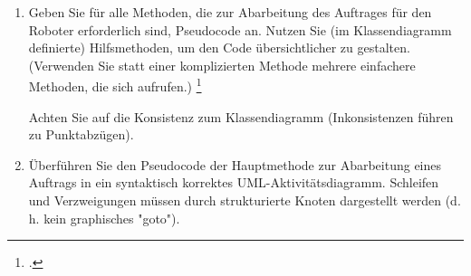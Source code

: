 \documentclass{bschlangaul-aufgabe}
\begin{document}

\begin{enumerate}


\item Geben Sie für alle Methoden, die zur Abarbeitung des Auftrages für
den Roboter erforderlich sind, Pseudocode an. Nutzen Sie (im
Klassendiagramm definierte) Hilfsmethoden, um den Code übersichtlicher
zu gestalten. (Verwenden Sie statt einer komplizierten Methode mehrere
einfachere Methoden, die sich aufrufen.)
\footcite{examen:66116:2019:03}

Achten Sie auf die Konsistenz zum Klassendiagramm (Inkonsistenzen führen
zu Punktabzügen).


\item Überführen Sie den Pseudocode der Hauptmethode zur Abarbeitung
eines Auftrags in ein syntaktisch korrektes UML-Aktivitätsdiagramm.
Schleifen und Verzweigungen müssen durch strukturierte Knoten
dargestellt werden (d. h. kein graphisches "goto").

\end{enumerate}
\end{document}
